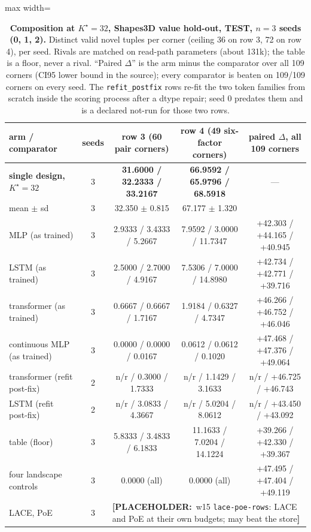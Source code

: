 \documentclass{article} %
\newcommand{\PLACEHOLDER}[1]{{\color{red}\textbf{[PLACEHOLDER:}~#1\textbf{]}}}
\newcommand{\Kstar}{\ensuremath{K^{\star}}}
\begin{document}
\begin{table}[t]
\centering\small
\caption{\textbf{Composition at $\Kstar=32$, Shapes3D value hold-out, TEST, $n=3$ seeds
(0, 1, 2).} Distinct valid novel tuples per corner (ceiling 36 on row 3, 72 on row 4), per %
seed. Rivals are matched on read-path parameters (about 131k); the table is a floor, never a %
rival. ``Paired $\Delta$'' is the arm minus the comparator over all 109 corners (CI95 lower %
bound in the source); every comparator is beaten on 109/109 corners on every seed. The %
\texttt{refit\_postfix} rows re-fit the two token families from scratch inside the scoring
process after a dtype repair; seed 0 predates them and is a declared not-run for those two
rows.}
\label{tab:t7}
\setlength{\tabcolsep}{3.2pt}
\begin{adjustbox}{max width=\linewidth}\begin{tabular}{lcccc}
\toprule
arm / comparator & seeds & row 3 (60 pair corners) & row 4 (49 six-factor corners) & paired $\Delta$, all 109 corners \\ %
\midrule
\textbf{single design, $\Kstar=32$} & 3 & \textbf{31.6000 / 32.2333 / 33.2167} & \textbf{66.9592 / 65.9796 / 68.5918} & --- \\
\quad mean $\pm$ sd & 3 & 32.350 $\pm$ 0.815 & 67.177 $\pm$ 1.320 & \\
MLP (as trained) & 3 & 2.9333 / 3.4333 / 5.2667 & 7.9592 / 3.0000 / 11.7347 & +42.303 / +44.165 / +40.945 \\
LSTM (as trained) & 3 & 2.5000 / 2.7000 / 4.9167 & 7.5306 / 7.0000 / 14.8980 & +42.734 / +42.771 / +39.716 \\
transformer (as trained) & 3 & 0.6667 / 0.6667 / 1.7167 & 1.9184 / 0.6327 / 4.7347 & +46.266 / +46.752 / +46.046 \\
continuous MLP (as trained) & 3 & 0.0000 / 0.0000 / 0.0167 & 0.0612 / 0.0612 / 0.1020 & +47.468 / +47.376 / +49.064 \\
transformer (refit post-fix) & 2 & n/r / 0.3000 / 1.7333 & n/r / 1.1429 / 3.1633 & n/r / +46.725 / +46.743 \\
LSTM (refit post-fix) & 2 & n/r / 3.0833 / 4.3667 & n/r / 5.0204 / 8.0612 & n/r / +43.450 / +43.092 \\
table (floor) & 3 & 5.8333 / 3.4833 / 6.1833 & 11.1633 / 7.0204 / 14.1224 & +39.266 / +42.330 / +39.367 \\
\midrule
four landscape controls & 3 & 0.0000 (all) & 0.0000 (all) & +47.495 / +47.404 / +49.119 \\
LACE, PoE & 3 & \multicolumn{3}{l}{\PLACEHOLDER{w15 \texttt{lace-poe-rows}: LACE and PoE at their own budgets; may beat the store}} \\
\bottomrule
\end{tabular}\end{adjustbox}
\end{table}
\end{document}
